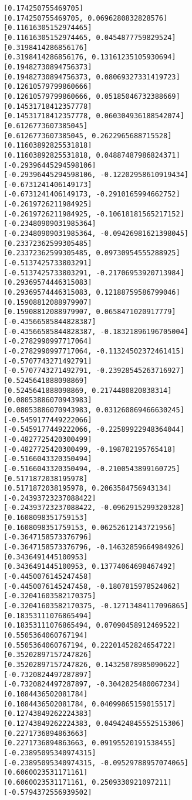 \documentclass[11pt]{article}
\begin{document}
\begin{Verbatim}[commandchars=\\\{\}]
[0.174250755469705]
[0.174250755469705, 0.0696280832828576]
[0.11616305152974465]
[0.11616305152974465, 0.0454877759829524]
[0.3198414286856176]
[0.3198414286856176, 0.13161235105930694]
[0.19482730894756373]
[0.19482730894756373, 0.08069327331419723]
[0.12610579799860666]
[0.12610579799860666, 0.05185046732388669]
[0.14531718412357778]
[0.14531718412357778, 0.060304936188542074]
[0.6126773607385045]
[0.6126773607385045, 0.2622965688715528]
[0.11603892825531818]
[0.11603892825531818, 0.04887487986824371]
[-0.29396445294598106]
[-0.29396445294598106, -0.12202958610919434]
[-0.6731241406149173]
[-0.6731241406149173, -0.2910165994662752]
[-0.2619726211984925]
[-0.2619726211984925, -0.10618181565217152]
[-0.23480909031985364]
[-0.23480909031985364, -0.09426981621398045]
[0.23372362599305485]
[0.23372362599305485, 0.09730954555288925]
[-0.5137425733803291]
[-0.5137425733803291, -0.21706953920713984]
[0.29369574446315083]
[0.29369574446315083, 0.12188759586799046]
[0.15908812088979907]
[0.15908812088979907, 0.0658471020917779]
[-0.43566585844828387]
[-0.43566585844828387, -0.18321896196705004]
[-0.2782990997717064]
[-0.2782990997717064, -0.11324502372461415]
[-0.5707743271492791]
[-0.5707743271492791, -0.23928545263716927]
[0.5245641888098869]
[0.5245641888098869, 0.2174480820838314]
[0.08053886070943983]
[0.08053886070943983, 0.031260869466630245]
[-0.5459177449222066]
[-0.5459177449222066, -0.22589922948364044]
[-0.4827725420300499]
[-0.4827725420300499, -0.198782195765418]
[-0.5166043320350494]
[-0.5166043320350494, -0.2100543899160725]
[0.5171872038195978]
[0.5171872038195978, 0.2063584756943134]
[-0.24393723237088422]
[-0.24393723237088422, -0.0962915299320328]
[0.1608098351759153]
[0.1608098351759153, 0.06252612143721956]
[-0.3647158573376796]
[-0.3647158573376796, -0.14632859664984926]
[0.3436491445100953]
[0.3436491445100953, 0.13774064698467492]
[-0.4450076145247458]
[-0.4450076145247458, -0.1807815978524062]
[-0.32041603582170375]
[-0.32041603582170375, -0.12713484117096865]
[0.18353111076865494]
[0.18353111076865494, 0.07090458912469522]
[0.5505364060767194]
[0.5505364060767194, 0.22201452824654722]
[0.35202897157247826]
[0.35202897157247826, 0.14325078985090622]
[-0.7320824497287897]
[-0.7320824497287897, -0.3042825480067234]
[0.1084436502081784]
[0.1084436502081784, 0.04099865159015517]
[0.12743849262224383]
[0.12743849262224383, 0.049424845552515306]
[0.2271736894863663]
[0.2271736894863663, 0.09195520191538455]
[-0.23895095340974315]
[-0.23895095340974315, -0.09529788957074065]
[0.6060023531171161]
[0.6060023531171161, 0.2509330921097211]
[-0.5794372556939502]

\end{Verbatim}
\end{document}
